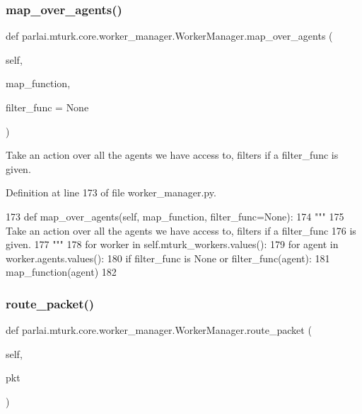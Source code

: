 \subsubsection{\texorpdfstring{map\+\_\+over\+\_\+agents()}{map\_over\_agents()}}
{\footnotesize\ttfamily def parlai.\+mturk.\+core.\+worker\+\_\+manager.\+Worker\+Manager.\+map\+\_\+over\+\_\+agents (\begin{DoxyParamCaption}\item[{}]{self,  }\item[{}]{map\+\_\+function,  }\item[{}]{filter\+\_\+func = {\ttfamily None} }\end{DoxyParamCaption})}

\begin{DoxyVerb}Take an action over all the agents we have access to, filters if a filter_func
is given.
\end{DoxyVerb}
 

Definition at line 173 of file worker\+\_\+manager.\+py.


\begin{DoxyCode}
173     \textcolor{keyword}{def }map\_over\_agents(self, map\_function, filter\_func=None):
174         \textcolor{stringliteral}{"""}
175 \textcolor{stringliteral}{        Take an action over all the agents we have access to, filters if a filter\_func}
176 \textcolor{stringliteral}{        is given.}
177 \textcolor{stringliteral}{        """}
178         \textcolor{keywordflow}{for} worker \textcolor{keywordflow}{in} self.mturk\_workers.values():
179             \textcolor{keywordflow}{for} agent \textcolor{keywordflow}{in} worker.agents.values():
180                 \textcolor{keywordflow}{if} filter\_func \textcolor{keywordflow}{is} \textcolor{keywordtype}{None} \textcolor{keywordflow}{or} filter\_func(agent):
181                     map\_function(agent)
182 
\end{DoxyCode}
\mbox{\label{classparlai_1_1mturk_1_1core_1_1worker__manager_1_1WorkerManager_a829bf9d74d9afb0277c11347745ac6db}} 
\subsubsection{\texorpdfstring{route\+\_\+packet()}{route\_packet()}}
{\footnotesize\ttfamily def parlai.\+mturk.\+core.\+worker\+\_\+manager.\+Worker\+Manager.\+route\+\_\+packet (\begin{DoxyParamCaption}\item[{}]{self,  }\item[{}]{pkt }\end{DoxyParamCaption})}

